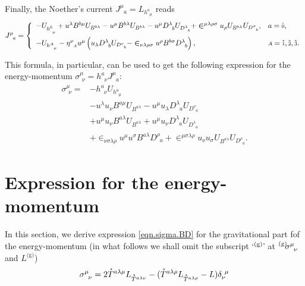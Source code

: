 \documentclass[
10pt, %
a4paper, %
oneside, %
headinclude,footinclude, %
BCOR5mm, %
]{scrartcl}
\newcommand{\sA}{\mathsmaller A}
\newcommand{\tetrsymbol}{h}
\newcommand{\itetrsymbol}{\eta}
\newcommand{\itetr}[2]{\itetrsymbol^{#1}_{\phantom{#1}#2}}
\newcommand{\tetr}[2]{\tetrsymbol^{#1}_{\phantom{#1}#2}}
\newcommand{\Dm}[2]{D_{\phantom{#2}#1}^{#2}}	%
\newcommand{\Bm}[2]{B^{#1#2}}	%
\newcommand{\Laghodge}{L}%
\newcommand{\Um}{U}%
\newcommand{\EMmat}[2]{\sigma^{#1}_{\ \,#2}}
\newcommand{\LCsymb}{\bm{\in}}    %
\newcommand{\gra}[1]{\prescript{\text{(g)}}{}{\hspace{-0.1cm}#1}}
\newcommand{\HDT}[1]{\accentset{\star}{T}^{#1}}
\newcommand{\KD}[2]{\delta^{\ #1}_{#2}}
\newcommand{\NC}[2]{J^{#2}_{\phantom{#2}#1}}
\newcommand{\indalg}[1]{\hat{\mathsmaller{#1}}}
\begin{document}
Finally, the Noether's current $ \NC{a}{\mu} = \Laghodge_{\tetr{a}{\mu}} $ reads
\begin{equation}
	\NC{a}{\mu} = \left\{
	\begin{array}{ll}
	-\Um_{\tetr{\indalg{0}}{\mu}}
	+ u^\lambda \Bm{b}{\mu} \Um_{\Bm{b}{\lambda}} 
	- u^\mu \Bm{b}{\lambda} \Um_{\Bm{b}{\lambda}} 
	- u^\mu \Dm{b}{\lambda} \Um_{\Dm{b}{\lambda}}
	+ \LCsymb^{\mu\lambda\rho\sigma} u_\rho \Um_{\Bm{b}{\lambda}}
	\Um_{\Dm{b}{\sigma}},	& a=\indalg{0},  \\[3mm] 
	-\Um_{\tetr{\sA}{\mu}}	
	- \itetr{\nu}{\sA}u^\mu
	\left(
	u_\lambda \Dm{b}{\lambda} \Um_{\Dm{b}{\nu}} 
	- \LCsymb_{\nu\lambda\rho\sigma}u^\rho\Bm{b}{\sigma}\Dm{b}{\lambda}
	\right), & \sA=\indalg{1},\indalg{2},\indalg{3}. \\ 
	\end{array} 
	\right.
\end{equation}

This formula, in particular, can be used to get the following expression for the energy-momentum $ 
\EMmat{\mu}{\nu} = \tetr{a}{\nu} \NC{a}{\mu}$:
\begin{align}
	\EMmat{\mu}{\nu} =
	& - \tetr{a}{\nu} \Um_{\tetr{a}{\mu}} \nonumber\\
	& - u^\lambda u_\nu \Bm{a}{\mu} \Um_{\Bm{a}{\lambda}} - u^\mu u_\lambda \Dm{a}{\lambda} 
	\Um_{\Dm{a}{\nu}}				\nonumber\\
	& + u^\mu u_\nu \Bm{a}{\lambda} \Um_{\Bm{a}{\lambda}} 
	+ u^\mu u_\nu \Dm{a}{\lambda} \Um_{\Dm{a}{\lambda}}
	\nonumber \\
	& + \LCsymb_{\nu\sigma\lambda\rho} u^\mu u^\sigma \Bm{a}{\lambda} \Dm{a}{\rho} 
	+ \LCsymb^{\mu\sigma\lambda\rho} u_\nu u_\sigma \Um_{\Bm{a}{\lambda}} 
	\Um_{\Dm{a}{\rho}}.\label{eqn.sigma.tetr.part}
\end{align}


\section{Expression for the energy-momentum}\label{app.energymomentum}

In this section, we derive expression \eqref{eqn.sigma.BD} for the gravitational part fof the 
energy-momentum (in what follows we shall omit the subscript `$ \gra{} $\,' at $ 
\gra{\EMmat{\mu}{\nu}} $ and $ \Laghodge^{\text{(g)}} $)
\begin{equation}\label{eqn.EM.hodge}
	\EMmat{\mu}{\nu} =
	 2 \HDT{a\lambda\mu}L_{\HDT{a\lambda\nu}} - 
	(\HDT{a\lambda\rho}L_{\HDT{a\lambda\rho}} - L) \KD{\mu}{\nu}
\end{equation}
\end{document}
